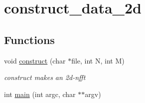 \hypertarget{group__applications__mri2d__construct__data__2d}{
\section{construct\_\-data\_\-2d}
\label{group__applications__mri2d__construct__data__2d}
}
\subsection*{Functions}
\begin{CompactItemize}
\item 
\hypertarget{group__applications__mri2d__construct__data__2d_g838247ac80ab4e2ac246eb969422bda1}{
void \hyperlink{group__applications__mri2d__construct__data__2d_g838247ac80ab4e2ac246eb969422bda1}{construct} (char $\ast$file, int N, int M)}
\label{group__applications__mri2d__construct__data__2d_g838247ac80ab4e2ac246eb969422bda1}

\begin{CompactList}\small\item\em construct makes an 2d-nfft \item\end{CompactList}\item 
\hypertarget{group__applications__mri2d__construct__data__2d_g3c04138a5bfe5d72780bb7e82a18e627}{
int \hyperlink{group__applications__mri2d__construct__data__2d_g3c04138a5bfe5d72780bb7e82a18e627}{main} (int argc, char $\ast$$\ast$argv)}
\label{group__applications__mri2d__construct__data__2d_g3c04138a5bfe5d72780bb7e82a18e627}

\end{CompactItemize}
